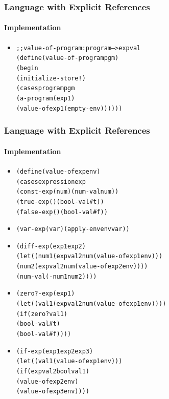\documentclass{beamer}
\begin{document}
\begin{frame}[fragile]
\frametitle{Language with Explicit References}
\framesubtitle{Implementation}
\begin{scriptsize}
\begin{itemize}
\item<1->
\begin{alltt}
;; value-of-program : program --> expval
(define (value-of-program pgm)
  (begin
    (initialize-store!)
    (cases program pgm
      (a-program (exp1)
                 (value-of exp1 (empty-env))))))
\end{alltt}

\end{itemize}
\end{scriptsize}
\end{frame}

\begin{frame}[fragile]
\frametitle{Language with Explicit References}
\framesubtitle{Implementation}
\begin{tiny}
\begin{itemize}
\item<1->
\begin{alltt}
(define (value-of exp env)
  (cases expression exp
    (const-exp (num) (num-val num))
    (true-exp () (bool-val #t))
    (false-exp () (bool-val #f))
\end{alltt}

\item<2->
\begin{alltt}
    (var-exp (var) (apply-env env var))
\end{alltt}

\item<3->
\begin{alltt}
    (diff-exp (exp1 exp2)
              (let ((num1 (expval2num (value-of exp1 env)))
                    (num2 (expval2num (value-of exp2 env))))
                (num-val (- num1 num2))))
\end{alltt}

\item<4->
\begin{alltt}
    (zero?-exp (exp1)
               (let ((val1 (expval2num (value-of exp1 env))))
                 (if (zero? val1)
                     (bool-val #t)
                     (bool-val #f))))
\end{alltt}

\item<5->
\begin{alltt}
    (if-exp (exp1 exp2 exp3)
            (let ((val1 (value-of exp1 env)))
              (if (expval2bool val1)
                  (value-of exp2 env)
                  (value-of exp3 env))))
\end{alltt}


\end{itemize}
\end{tiny}
\end{frame}
\end{document}
